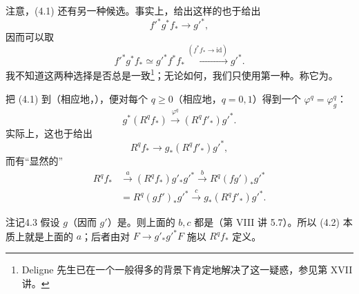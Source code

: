 注意，(4.1) 还有另一种候选。事实上，给出这样的也于给出
\[
f'^*g^*f_*\longrightarrow g'^*,
\]
因而可以取
\[
f'^*g^*f_*\simeq g'^*f^*f_*\xrightarrow{(f^*f_*\to\mathrm{id})}g'^*.
\]
我不知道这两种选择是否总是一致\footnote{Deligne 先生已在一个一般得多的背景下肯定地解决了这一疑惑，参见第 XVII 讲。}；无论如何，我们只使用第一种。称它为。

把 (4.1) 到（相应地，），便对每个 $q\geq0$（相应地，$q=0,1$）得到一个 $\varphi^q=\varphi_g^q$：
\[
g^*(R^qf_*)\xrightarrow{\varphi^q}(R^qf'_*)g'^*.\tag{4.2}
\]
实际上，这也于给出
\[
R^qf_*\longrightarrow g_*(R^qf'_*)g'^*,\tag{4.2 adj}
\]
而有“显然的”
\[
\begin{aligned}
R^qf_*&\xrightarrow{a}(R^qf_*)g'_*g'^*
\xrightarrow{b}R^q(fg')_*g'^*\\
&=R^q(gf')_*g'^*\xrightarrow{c}g_*(R^qf'_*)g'^*.
\end{aligned}
\]

\begin{SGAresult}{注记}{4.3}
假设 $g$（因而 $g'$）是。则上面的 $b,c$ 都是（第 VIII 讲 5.7）。所以 (4.2) 本质上就是上面的 $a$；后者由对 $F\to g'_*g'^*F$ 施以 $R^qf_*$ 定义。
\end{SGAresult}

